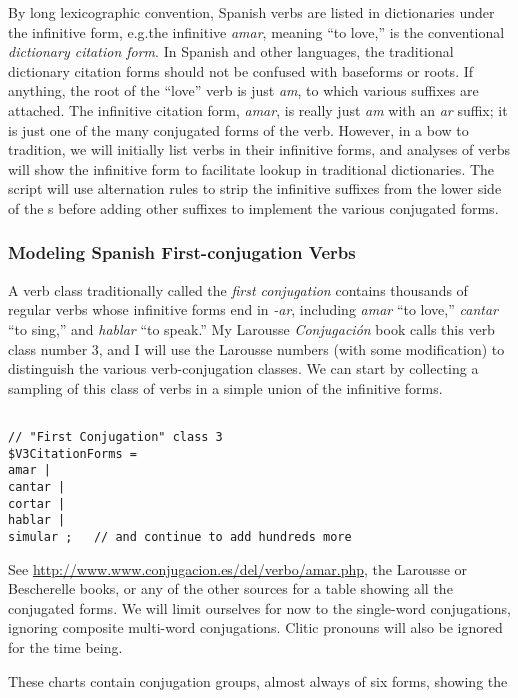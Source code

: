 By long lexicographic convention, Spanish verbs are listed in
dictionaries under the infinitive form, e.g.\@ the infinitive
\emph{amar}, meaning ``to love,'' is the conventional \emph{dictionary
citation form}.  In Spanish and other languages, the traditional dictionary citation
forms should not be confused with baseforms or roots.  If anything, the
root
of the ``love'' verb is just \emph{am}, to which various suffixes
are attached.  The infinitive citation form, \emph{amar}, is really just \emph{am}
with an \emph{ar} suffix; it is just one of the many conjugated forms
of the verb.  However, in a bow to tradition, we will
initially list verbs in their infinitive forms, and analyses of verbs
will show the infinitive form to facilitate lookup in traditional
dictionaries.  The script will use alternation
rules to strip the infinitive suffixes from the lower side of the
\fsm{}s before adding other suffixes to implement the various conjugated
forms.


\subsubsection{Modeling Spanish First-conjugation Verbs}

A verb class traditionally called the \emph{first conjugation}
contains thousands of regular verbs whose
infinitive forms end in \emph{-ar}, including \emph{amar} ``to love,''
\emph{cantar} ``to sing,'' and \emph{hablar} ``to speak.''  My Larousse
\emph{Conjugación} book
calls this verb class number 3, and I will use the Larousse numbers
(with some modification)
to distinguish the various verb-conjugation classes.  We can start
by collecting a sampling of this class of verbs in a simple union of the
infinitive forms.

\begin{Verbatim}

// "First Conjugation" class 3
$V3CitationForms =
amar |
cantar |
cortar |
hablar |
simular ;	// and continue to add hundreds more
\end{Verbatim}

\noindent
See \url{http://www.www.conjugacion.es/del/verbo/amar.php}, the
Larousse or Bescherelle books, or any of the other sources for a table
showing all the conjugated forms.  We will limit ourselves for now to the
single-word conjugations, ignoring composite multi-word conjugations.
Clitic
pronouns will also be ignored for the time being. 

These charts contain conjugation groups, almost always of six forms,
showing the

